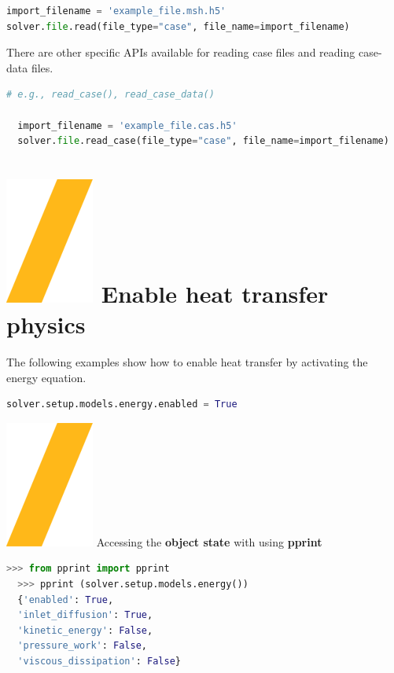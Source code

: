 \documentclass[9pt,landscape]{article}
\begin{document}
\begin{multicols}{3}
\begin{lstlisting}[language=Python]
import_filename = 'example_file.msh.h5'
solver.file.read(file_type="case", file_name=import_filename)
\end{lstlisting}

There are other specific APIs available for reading case files and
reading case-data files. 

\begin{lstlisting}[language=Python]
  # e.g., read_case(), read_case_data()

  import_filename = 'example_file.cas.h5'
  solver.file.read_case(file_type="case", file_name=import_filename)  
\end{lstlisting}


\section{\includegraphics[height=\fontcharht\font`\S]{slash.png} Enable heat transfer physics}

The following examples show how to enable heat transfer by activating the energy equation.

\begin{lstlisting}[language=Python]
solver.setup.models.energy.enabled = True
\end{lstlisting}

{\includegraphics[height=\fontcharht\font`\S]{slash.png} Accessing the \textbf{object state} with using \textbf{pprint}

\begin{lstlisting}[language=Python]
  >>> from pprint import pprint
  >>> pprint (solver.setup.models.energy())
  {'enabled': True,
  'inlet_diffusion': True,
  'kinetic_energy': False,
  'pressure_work': False,
  'viscous_dissipation': False}  
\end{lstlisting}


}
\end{multicols}
\end{document}
